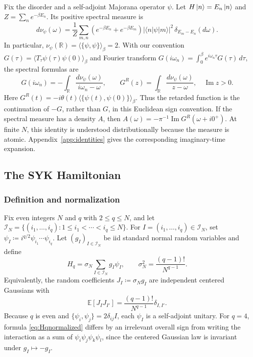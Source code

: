 \documentclass[11pt]{article}
\numberwithin{equation}{section}
\theoremstyle{exposition}
\theoremstyle{result}
\newcommand{\E}{\mathbb E}
\newcommand{\R}{\mathbb R}
\begin{document}
Fix the disorder and a self-adjoint Majorana operator $\psi$. Let $H\ket n=E_n\ket n$ and $Z=\sum_n e^{-\beta E_n}$. Its positive spectral measure is
\begin{equation}
d\nu_\psi(\omega)=\frac1Z\sum_{m,n}
(e^{-\beta E_n}+e^{-\beta E_m})
|\langle n|\psi|m\rangle|^2\,
\delta_{E_m-E_n}(d\omega).
\label{eq:spectralmeasure}
\end{equation}
In particular, $\nu_\psi(\R)=\langle\{\psi,\psi\}\rangle_\beta=2$.
With our convention $G(\tau)=\langle T_\tau\psi(\tau)\psi(0)\rangle_\beta$ and Fourier transform $G(i\omega_n)=\int_0^\beta e^{i\omega_n\tau}G(\tau)\,d\tau$, the spectral formulas are
\begin{equation}
G(i\omega_n)=-\int_\R\frac{d\nu_\psi(\omega)}{i\omega_n-\omega},
\qquad
G^R(z)=\int_\R\frac{d\nu_\psi(\omega)}{z-\omega},\quad \operatorname{Im}z>0.
\label{eq:spectral}
\end{equation}
Here $G^R(t)=-i\theta(t)\langle\{\psi(t),\psi(0)\}\rangle_\beta$. Thus the retarded function is the continuation of $-G$, rather than $G$, in this Euclidean sign convention. If the spectral measure has a density $A$, then $A(\omega)=-\pi^{-1}\operatorname{Im}G^R(\omega+i0^+)$. At finite $N$, this identity is understood distributionally because the measure is atomic. Appendix~\ref{app:identities} gives the corresponding imaginary-time expansion.

\subsection{The SYK Hamiltonian}

\subsubsection{Definition and normalization}

Fix even integers $N$ and $q$ with $2\leq q\leq N$, and let $\mathcal I_N=\{(i_1,\ldots,i_q):1\le i_1<\cdots<i_q\le N\}$. For $I=(i_1,\ldots,i_q)\in\mathcal I_N$, set $\psi_I\coloneqq i^{q/2}\psi_{i_1}\cdots\psi_{i_q}$. Let $(g_I)_{I\in\mathcal I_N}$ be iid standard normal random variables and define
\begin{equation}
H_q=\sigma_N\sum_{I\in\mathcal I_N}g_I\psi_I,
\qquad
\sigma_N^2=\frac{(q-1)!}{N^{q-1}}.
\label{eq:Hqnormalized}
\end{equation}
Equivalently, the random coefficients $J_I\coloneqq \sigma_Ng_I$ are independent centered Gaussians with
\begin{equation}
\E[J_IJ_{I'}]
=\frac{(q-1)!}{N^{q-1}}\delta_{I,I'}.
\label{eq:Jcovariance}
\end{equation}
Because $q$ is even and $\{\psi_i,\psi_j\}=2\delta_{ij}I$, each $\psi_I$ is a self-adjoint unitary. For $q=4$, formula \eqref{eq:Hqnormalized} differs by an irrelevant overall sign from writing the interaction as a sum of $\psi_i\psi_j\psi_k\psi_l$, since the centered Gaussian law is invariant under $g_I\mapsto-g_I$.
\end{document}
